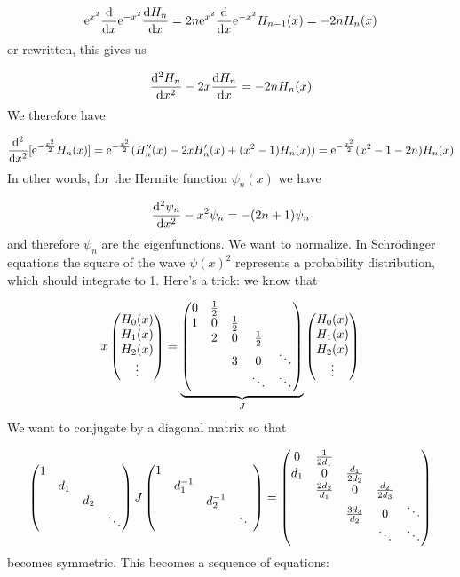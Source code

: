 \documentclass[12pt,landscape]{article}
\def\half{ {1 \over 2} }
\def\D{ {\rm d} }
\def\E{ {\rm e} }
\def\dx{\D x}
\begin{document}
{\[
\E^{x^2} {\D \over \dx} \E^{-x^2} {\D H_n \over \dx} = 2n \E^{x^2} {\D \over \dx} \E^{-x^2} H_{n-1}(x) = -2nH_n(x)
\]
or rewritten, this gives us

\[
{\D^2 H_n \over \dx^2} -2x {\D H_n \over \dx} = -2nH_n(x)
\]
We therefore have

\[
{\D^2 \over \dx^2}[\E^{-{x^2 \over 2}} H_n(x)] = \E^{-{x^2 \over 2}} (H_n''(x)  -2x H_n'(x) + (x^2-1) H_n(x)) = \E^{-{x^2 \over 2}} (x^2-1-2n) H_n(x)
\]
In other words, for the Hermite function $\psi_n(x)$ we have

\[
{\D^2 \psi_n \over \dx^2} -x^2 \psi_n = -(2n+1) \psi_n
\]
and therefore $\psi_n$ are the eigenfunctions.
\newpage
We want to normalize.  In Schrödinger equations the square of the wave $\psi(x)^2$ represents a probability distribution, which should integrate to 1. Here's a trick: we know that

\[
x \begin{pmatrix} H_0(x) \\ H_1(x) \\ H_2(x) \\ \vdots \end{pmatrix} = \underbrace{\begin{pmatrix} 0 & {1 \over 2} \\
1 & 0 & \half \\
& 2 & 0 & \half \\
&& 3 & 0 & \ddots \\
&&& \ddots & \ddots
\end{pmatrix}}_J\begin{pmatrix} H_0(x) \\ H_1(x) \\ H_2(x) \\ \vdots \end{pmatrix}
\]
We want to conjugate by a diagonal matrix so that

\[
\begin{pmatrix}1 \\ & d_1 \\ &&d_2 \\&&&\ddots \end{pmatrix}  J \begin{pmatrix}1 \\ & d_1^{-1} \\ &&d_2^{-1} \\&&&\ddots \end{pmatrix} = \begin{pmatrix} 0 & {1 \over 2d_1} \\
d_1 & 0 & {d_1 \over 2 d_2} \\
& {2d_2 \over d_1} & 0 & {d_2 \over 2 d_3} \\
&& {3d_3 \over d_2} & 0 & \ddots \\
&&& \ddots & \ddots
\end{pmatrix}
\]
becomes symmetric. This becomes a sequence of equations:


}
\end{document}
